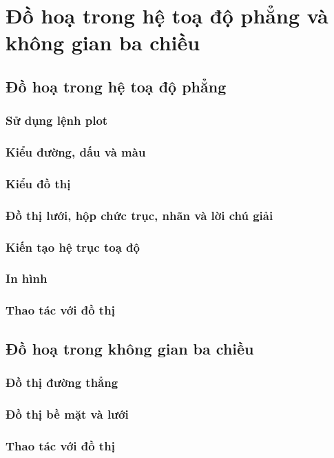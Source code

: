 \documentclass[12pt,a4paper]{article}
\begin{document}
\section{Đồ hoạ trong hệ toạ độ phẳng và không gian ba chiều}
\subsection{Đồ hoạ trong hệ toạ độ phẳng}
\subsubsection{Sử dụng lệnh plot}
\subsubsection{Kiểu đường, dấu và màu}
\subsubsection{Kiểu đồ thị}
\subsubsection{Đồ thị lưới, hộp chức trục, nhãn và lời chú giải}
\subsubsection{Kiến tạo hệ trục toạ độ}
\subsubsection{In hình}
\subsubsection{Thao tác với đồ thị}
\subsection{Đồ hoạ trong không gian ba chiều}
\subsubsection{Đồ thị đường thẳng}
\subsubsection{Đồ thị bề mặt và lưới}
\subsubsection{Thao tác với đồ thị}
\end{document}
